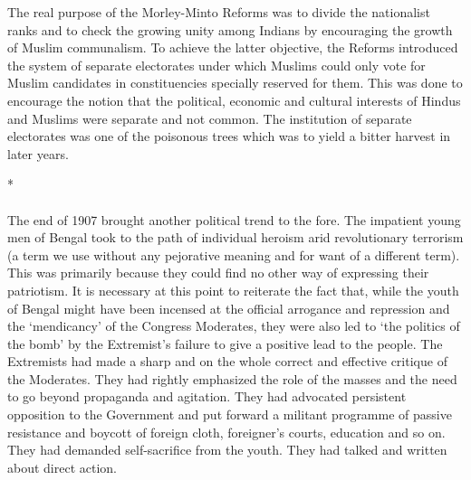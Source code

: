 \begin{multicols}{2}
The real purpose of the Morley-Minto Reforms was to divide the nationalist ranks and to check the growing unity among Indians by encouraging the growth of Muslim communalism. To achieve the latter objective, the Reforms introduced the system of separate electorates under which Muslims could only vote for Muslim candidates in constituencies specially reserved for them. This was done to encourage the notion that the political, economic and cultural interests of Hindus and Muslims were separate and not common. The institution of separate electorates was one of the poisonous trees which was to yield a bitter harvest in later years.

\begin{center}*\end{center}

\paragraph*{}

The end of 1907 brought another political trend to the fore. The impatient young men of Bengal took to the path of individual heroism arid revolutionary terrorism (a term we use without any pejorative meaning and for want of a different term). This was primarily because they could find no other way of expressing their patriotism. It is necessary at this point to reiterate the fact that, while the youth of Bengal might have been incensed at the official arrogance and repression and the `mendicancy' of the Congress Moderates, they were also led to `the politics of the bomb' by the Extremist's failure to give a positive lead to the people. The Extremists had made a sharp and on the whole correct and effective critique of the Moderates. They had rightly emphasized the role of the masses and the need to go beyond propaganda and agitation. They had advocated persistent opposition to the Government and put forward a militant programme of passive resistance and boycott of foreign cloth, foreigner's courts, education and so on. They had demanded self-sacrifice from the youth. They had talked and written about direct action.


\end{multicols}
